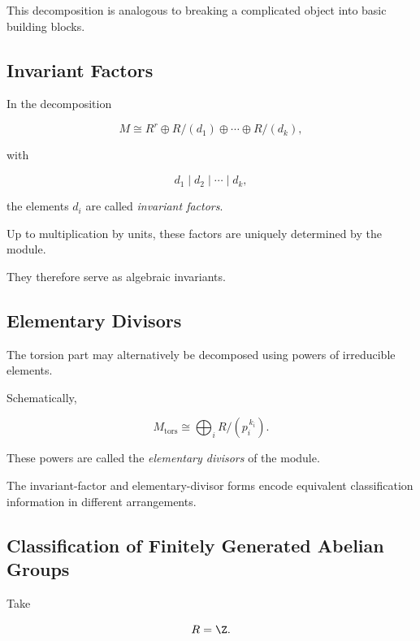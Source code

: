 This decomposition is analogous to breaking a complicated object into basic
building blocks.

\subsection{Invariant Factors}
\label{subsec:module-invariant-factors}

In the decomposition

\[ M\cong R^r\oplus R/(d_1)\oplus\cdots\oplus R/(d_k), \]

with

\[ d_1\mid d_2\mid\cdots\mid d_k, \]

the elements \(d_i\) are called \emph{invariant factors}.

Up to multiplication by units, these factors are uniquely determined by the
module.

They therefore serve as algebraic invariants.

\subsection{Elementary Divisors}
\label{subsec:module-elementary-divisors}

The torsion part may alternatively be decomposed using powers of irreducible
elements.

Schematically,

\[ M_{\text{tors}}\cong\bigoplus_iR/(p_i^{\,k_i}). \]

These powers are called the \emph{elementary divisors} of the module.

The invariant-factor and elementary-divisor forms encode equivalent
classification information in different arrangements.

\subsection{Classification of Finitely Generated Abelian Groups}
\label{subsec:fg-abelian-groups-modules}

Take

\[ R=\Z. \]

